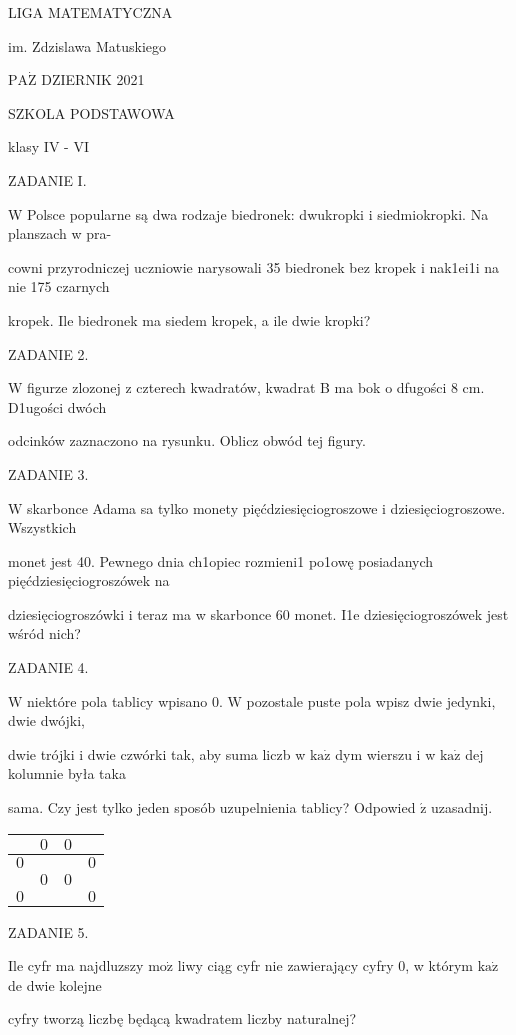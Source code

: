 \documentclass[a4paper,12pt]{article}
\begin{document}
LIGA MATEMATYCZNA

im. Zdzislawa Matuskiego

$\mathrm{P}\mathrm{A}\dot{\mathrm{Z}}$ DZIERNIK 2021

SZKOLA PODSTAWOWA

klasy IV - VI

ZADANIE I.

W Polsce popularne są dwa rodzaje biedronek: dwukropki i siedmiokropki. Na planszach w pra-

cowni przyrodniczej uczniowie narysowali 35 biedronek bez kropek i nak1ei1i na nie 175 czarnych

kropek. Ile biedronek ma siedem kropek, a ile dwie kropki?

ZADANIE 2.

W figurze zlozonej z czterech kwadratów, kwadrat B ma bok o dfugości 8 cm. D1ugości dwóch

odcinków zaznaczono na rysunku. Oblicz obwód tej figury.

ZADANIE 3.

$\mathrm{W}$ skarbonce Adama sa tylko monety pięćdziesięciogroszowe i dziesięciogroszowe. Wszystkich

monet jest 40. Pewnego dnia ch1opiec rozmieni1 po1owę posiadanych pięćdziesięciogroszówek na

dziesięciogroszówki i teraz ma w skarbonce 60 monet. I1e dziesięciogroszówek jest wśród nich?

ZADANIE 4.

$\mathrm{W}$ niektóre pola tablicy wpisano 0. $\mathrm{W}$ pozostale puste pola wpisz dwie jedynki, dwie dwójki,

dwie trójki i dwie czwórki tak, aby suma liczb w $\mathrm{k}\mathrm{a}\dot{\mathrm{z}}$ dym wierszu i w $\mathrm{k}\mathrm{a}\dot{\mathrm{z}}$ dej kolumnie była taka

sama. Czy jest tylko jeden sposób uzupelnienia tablicy? Odpowied $\acute{\mathrm{z}}$ uzasadnij.
\begin{center}
\begin{tabular}{|l|l|l|l|}
\hline
\multicolumn{1}{|l|}{}&	\multicolumn{1}{|l|}{$0$}&	\multicolumn{1}{|l|}{ $0$}&	\multicolumn{1}{|l|}{}	\\
\hline
\multicolumn{1}{|l|}{ $0$}&	\multicolumn{1}{|l|}{}&	\multicolumn{1}{|l|}{}&	\multicolumn{1}{|l|}{ $0$}	\\
\hline
\multicolumn{1}{|l|}{}&	\multicolumn{1}{|l|}{ $0$}&	\multicolumn{1}{|l|}{ $0$}&	\multicolumn{1}{|l|}{}	\\
\hline
\multicolumn{1}{|l|}{ $0$}&	\multicolumn{1}{|l|}{}&	\multicolumn{1}{|l|}{}&	\multicolumn{1}{|l|}{ $0$}	\\
\hline
\end{tabular}

\end{center}
ZADANIE 5.

Ile cyfr ma najdluzszy $\mathrm{m}\mathrm{o}\dot{\mathrm{z}}$ liwy ciąg cyfr nie zawierający cyfry 0, w którym $\mathrm{k}\mathrm{a}\dot{\mathrm{z}}$ de dwie kolejne

cyfry tworzą liczbę będącą kwadratem liczby naturalnej?
\end{document}
